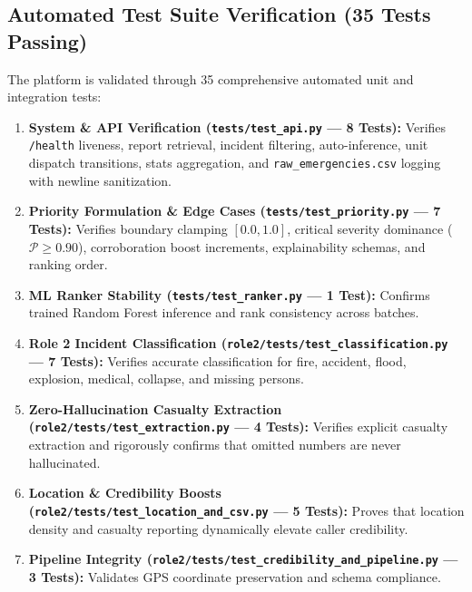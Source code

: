 \documentclass[10pt,a4paper]{article}
\begin{document}
\subsection{Automated Test Suite Verification (35 Tests Passing)}
The platform is validated through 35 comprehensive automated unit and integration tests:
\begin{enumerate}
  \item \textbf{System \& API Verification (\texttt{tests/test\_api.py} --- 8 Tests):} Verifies \texttt{/health} liveness, report retrieval, incident filtering, auto-inference, unit dispatch transitions, stats aggregation, and \texttt{raw\_emergencies.csv} logging with newline sanitization.
  \item \textbf{Priority Formulation \& Edge Cases (\texttt{tests/test\_priority.py} --- 7 Tests):} Verifies boundary clamping $[0.0, 1.0]$, critical severity dominance ($\mathcal{P} \ge 0.90$), corroboration boost increments, explainability schemas, and ranking order.
  \item \textbf{ML Ranker Stability (\texttt{tests/test\_ranker.py} --- 1 Test):} Confirms trained Random Forest inference and rank consistency across batches.
  \item \textbf{Role 2 Incident Classification (\texttt{role2/tests/test\_classification.py} --- 7 Tests):} Verifies accurate classification for fire, accident, flood, explosion, medical, collapse, and missing persons.
  \item \textbf{Zero-Hallucination Casualty Extraction (\texttt{role2/tests/test\_extraction.py} --- 4 Tests):} Verifies explicit casualty extraction and rigorously confirms that omitted numbers are never hallucinated.
  \item \textbf{Location \& Credibility Boosts (\texttt{role2/tests/test\_location\_and\_csv.py} --- 5 Tests):} Proves that location density and casualty reporting dynamically elevate caller credibility.
  \item \textbf{Pipeline Integrity (\texttt{role2/tests/test\_credibility\_and\_pipeline.py} --- 3 Tests):} Validates GPS coordinate preservation and schema compliance.
\end{enumerate}


\end{document}

